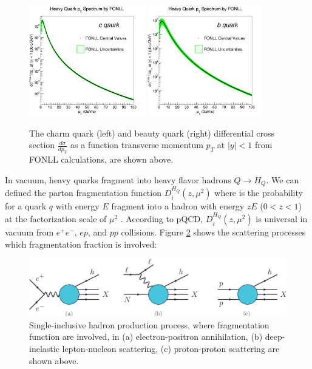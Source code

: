  \begin{figure}[hbtp]
\begin{center}
\includegraphics[width=0.45\textwidth]{Figures/Chapter1/Charm.png}
\includegraphics[width=0.45\textwidth]{Figures/Chapter1/Beauty.png}
\caption{The charm quark (left) and beauty quark (right) differential cross section $\frac{d\sigma}{dp_T}$ as a function transverse momentum $p_T$ at $|y| < 1$ from FONLL calculations, are shown above.}
\label{FONLL}
\end{center}
\end{figure}   

In vacuum, heavy quarks fragment into heavy flavor hadrons $Q \rightarrow H_Q$. We can defined the parton fragmentation function $D^{H_Q}_{i}(z,\mu^2)$ where is the probability for a quark $q$ with energy $E$ fragment into a hadron with energy $zE$ ($0 < z < 1$) at the factorization scale of $\mu^2$ \cite{QCDFFunc}. According to pQCD, $D^{H_Q}_{i}(z,\mu^2)$ is universal in vacuum from $e^+e^-$, $ep$, and $pp$ collisions. Figure \ref{FFProcess} shows the scattering processes which fragmentation fraction is involved:

 \begin{figure}[hbtp]
\begin{center}
\includegraphics[width=1.0\textwidth]{Figures/Chapter1/FFProcess.png}
\caption{Single-inclusive hadron production process, where fragmentation function are involved, in (a) electron-positron annihilation, (b) deep-inelastic lepton-nucleon scattering, (c) proton-proton scattering are shown above.}
\label{FFProcess}
\end{center}
\end{figure}   

